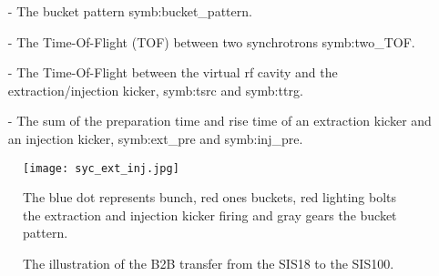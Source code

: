 \begin{itemize}
\item[-] The bucket pattern \gls{symb:bucket_pattern}.
\item[-] The Time-Of-Flight (\gls{TOF}) between two synchrotrons \gls{symb:two_TOF}. 
\item[-] The Time-Of-Flight between the virtual rf cavity and the extraction/injection kicker, \gls{symb:tsrc} and \gls{symb:ttrg}. 
\item[-] The sum of the preparation time and rise time of an extraction kicker and an injection kicker, \gls{symb:ext_pre} and \gls{symb:inj_pre}.
\end{itemize}
\begin{figure}[!htb]
   \centering   
   \texttt{[image: syc\_ext\_inj.jpg]}
   \caption{The illustration of the B2B transfer from the SIS18 to the SIS100.}{The blue dot represents bunch, red ones buckets, red lighting bolts the extraction and injection kicker firing and gray gears the bucket pattern.}
   \label{ext_inj_kicker}
\end{figure}
